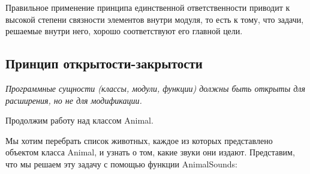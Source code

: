 \documentclass[a4paper]{article}
\begin{document}
Правильное применение принципа единственной ответственности приводит к высокой степени связности элементов внутри модуля, то есть к тому, что задачи, решаемые внутри него, хорошо соответствуют его главной цели.

\subsection{Принцип открытости-закрытости}

\textit{Программные сущности (классы, модули, функции) должны быть открыты для расширения, но не для модификации.}

Продолжим работу над классом Animal.

\begin{figure}[h]
\end{figure}

Мы хотим перебрать список животных, каждое из которых представлено объектом класса Animal, и узнать о том, какие звуки они издают. Представим, что мы решаем эту задачу с помощью функции AnimalSounds:

\begin{figure}[h]
\end{figure}
\end{document}
